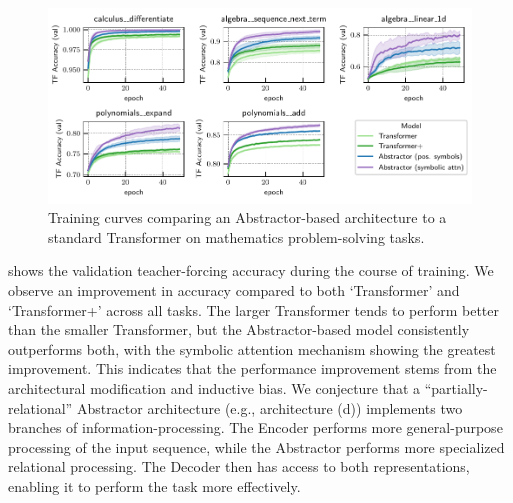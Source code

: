 \begin{figure}[t]
    \centering
    \includegraphics[width=\textwidth]{figures/experiments/math_training_curves.pdf}
    \vskip-10pt
    \caption{Training curves comparing an Abstractor-based architecture to a standard Transformer on mathematics problem-solving tasks.}\label{fig:math_training_curves}
    \vskip -10pt
\end{figure}

 shows the validation teacher-forcing accuracy during the course of training. We observe an improvement in accuracy compared to both `Transformer' and `Transformer+' across all tasks. The larger Transformer tends to perform better than the smaller Transformer, but the Abstractor-based model consistently outperforms both, with the symbolic attention mechanism showing the greatest improvement. This indicates that the performance improvement stems from the architectural modification and inductive bias. We conjecture that a ``partially-relational'' Abstractor architecture (e.g., architecture (d)) implements two branches of information-processing. The Encoder performs more general-purpose processing of the input sequence, while the Abstractor performs more specialized relational processing. The Decoder then has access to both representations, enabling it to perform the task more effectively.
